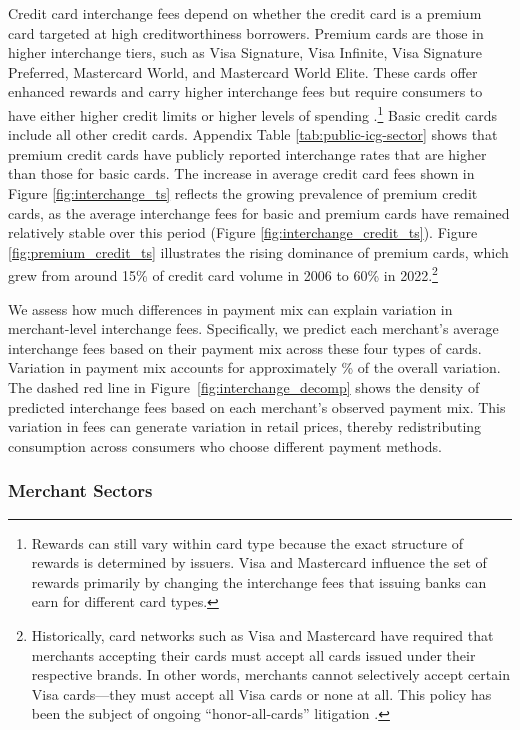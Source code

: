 \documentclass[main.tex]{subfiles}
\begin{document}
Credit card interchange fees depend on whether the credit card is a premium card targeted at high creditworthiness borrowers.
Premium cards are those in higher interchange tiers, such as Visa Signature, Visa Infinite, Visa Signature Preferred, Mastercard World, and Mastercard World Elite.
These cards offer enhanced rewards and carry higher interchange fees but require consumers to have either higher credit limits or higher levels of spending \citep{Visa2022}.\footnote{Rewards can still vary within card type because the exact structure of rewards is determined by issuers. Visa and Mastercard influence the set of rewards primarily by changing the interchange fees that issuing banks can earn for different card types.}
Basic credit cards include all other credit cards.
Appendix Table \ref{tab:public-icg-sector} shows that premium credit cards have publicly reported interchange rates that are higher than those for basic cards.
The increase in average credit card fees shown in Figure \ref{fig:interchange_ts} reflects the growing prevalence of premium credit cards, as the average interchange fees for basic and premium cards have remained relatively stable over this period (Figure \ref{fig:interchange_credit_ts}).
Figure \ref{fig:premium_credit_ts} illustrates the rising dominance of premium cards, which grew from around 15\% of credit card volume in 2006 to 60\% in 2022.\footnote{Historically, card networks such as Visa and Mastercard have required that merchants accepting their cards must accept all cards issued under their respective brands.
In other words, merchants cannot selectively accept certain Visa cards---they must accept all Visa cards or none at all.
This policy has been the subject of ongoing ``honor-all-cards'' litigation \citep{Andriotis2025}.
}

We assess how much differences in payment mix can explain variation in merchant-level interchange fees.
Specifically, we predict each merchant's average interchange fees based on their payment mix across these four types of cards.
Variation in payment mix accounts for approximately \% of the overall variation.
The dashed red line in Figure~\ref{fig:interchange_decomp} shows the density of predicted interchange fees based on each merchant's observed payment mix.
This variation in fees can generate variation in retail prices, thereby redistributing consumption across consumers who choose different payment methods.

\subsubsection{Merchant Sectors}
\end{document}
